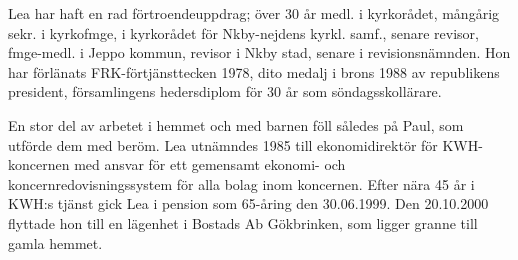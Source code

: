 Lea har haft en rad förtroendeuppdrag; över 30 år medl. i kyrkorådet, mångårig sekr. i kyrkofmge, i kyrkorådet för Nkby-nejdens kyrkl. samf., senare revisor, fmge-medl. i Jeppo kommun, revisor i Nkby stad, senare i revisionsnämnden. Hon har förlänats FRK-förtjänsttecken 1978, dito medalj i brons 1988 av republikens president, församlingens hedersdiplom för 30 år som söndagsskollärare.

En stor del av arbetet i hemmet och med barnen föll således på Paul, som utförde dem med beröm. Lea utnämndes 1985 till ekonomidirektör för KWH-koncernen med ansvar för ett gemensamt ekonomi- och koncernredovisningssystem för alla bolag inom koncernen. Efter nära 45 år i KWH:s tjänst gick Lea i pension som 65-åring den 30.06.1999. Den 20.10.2000 flyttade hon till en lägenhet i Bostads Ab Gökbrinken, som ligger granne till gamla hemmet.


